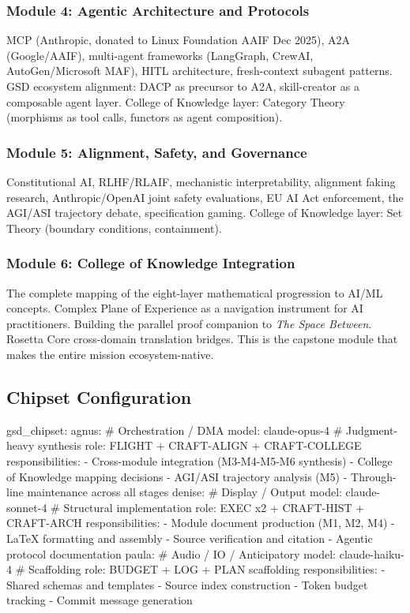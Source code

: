 \documentclass[11pt,letterpaper]{article}
\begin{document}
\subsubsection{Module 4: Agentic Architecture and Protocols}
MCP (Anthropic, donated to Linux Foundation AAIF Dec 2025), A2A (Google/AAIF), multi-agent frameworks (LangGraph, CrewAI, AutoGen/Microsoft MAF), HITL architecture, fresh-context subagent patterns. GSD ecosystem alignment: DACP as precursor to A2A, skill-creator as a composable agent layer. College of Knowledge layer: Category Theory (morphisms as tool calls, functors as agent composition).

\subsubsection{Module 5: Alignment, Safety, and Governance}
Constitutional AI, RLHF/RLAIF, mechanistic interpretability, alignment faking research, Anthropic/OpenAI joint safety evaluations, EU AI Act enforcement, the AGI/ASI trajectory debate, specification gaming. College of Knowledge layer: Set Theory (boundary conditions, containment).

\subsubsection{Module 6: College of Knowledge Integration}
The complete mapping of the eight-layer mathematical progression to AI/ML concepts. Complex Plane of Experience as a navigation instrument for AI practitioners. Building the parallel proof companion to \textit{The Space Between}. Rosetta Core cross-domain translation bridges. This is the capstone module that makes the entire mission ecosystem-native.

\subsection{Chipset Configuration}

\begin{asciibox}
   gsd_chipset:
     agnus:                    # Orchestration / DMA
       model: claude-opus-4    # Judgment-heavy synthesis
       role: FLIGHT + CRAFT-ALIGN + CRAFT-COLLEGE
       responsibilities:
         - Cross-module integration (M3-M4-M5-M6 synthesis)
         - College of Knowledge mapping decisions
         - AGI/ASI trajectory analysis (M5)
         - Through-line maintenance across all stages
     denise:                   # Display / Output
       model: claude-sonnet-4  # Structural implementation
       role: EXEC x2 + CRAFT-HIST + CRAFT-ARCH
       responsibilities:
         - Module document production (M1, M2, M4)
         - LaTeX formatting and assembly
         - Source verification and citation
         - Agentic protocol documentation
     paula:                    # Audio / IO / Anticipatory
       model: claude-haiku-4   # Scaffolding
       role: BUDGET + LOG + PLAN scaffolding
       responsibilities:
         - Shared schemas and templates
         - Source index construction
         - Token budget tracking
         - Commit message generation
\end{asciibox}
\end{document}
